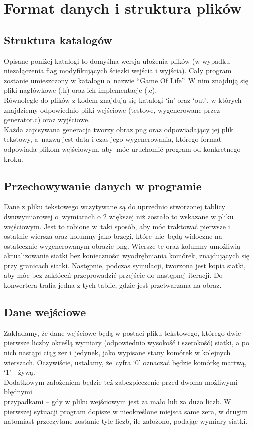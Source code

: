\documentclass{article}
\begin{document}
\section{Format danych i struktura plików}
\subsection{Struktura katalogów}
Opisane poniżej katalogi to domyślna wersja ułożenia plików (w
wypadku niezałączenia flag modyfikujących ścieżki wejścia i wyjścia).
Cały program zostanie umieszczony w katalogu o~nazwie “Game Of
Life”. W nim znajdują się pliki nagłówkowe (.h) oraz ich
implementacje (.c).\\ Równolegle do plików z kodem znajdują się katalogi ‘in’ oraz ‘out’,
 w których znajdziemy odpowiednio pliki wejściowe (testowe,
 wygenerowane przez generator.c) oraz wyjściowe.\\
 Każda zapisywana generacja tworzy obraz png oraz odpowiadający
 jej plik tekstowy, a~nazwą jest data i czas jego wygenerowania, którego
 format odpowiada plikom wejściowym, aby~móc uruchomić program od konkretnego kroku.

\subsection{Przechowywanie danych w programie}
Dane z pliku tekstowego wczytywane są do uprzednio stworzonej tablicy
dwuwymiarowej o~wymiarach o 2 większej niż zostało to wskazane w pliku
wejściowym. Jest to robione w~taki sposób, aby móc traktować pierwsze i
ostatnie wiersza oraz kolumny jako brzegi, które~nie~będą widoczne na
ostatecznie wygenerowanym obrazie png. Wiersze te oraz kolumny umożliwią
aktualizowanie siatki bez konieczności wyodrębniania komórek,
znajdujących się przy granicach siatki. Następnie, podczas symulacji, tworzona
jest kopia siatki, aby móc bez zakłóceń przeprowadzić przejście do następnej iteracji.
Do konwertera trafia jedna z tych tablic, gdzie jest przetwarzana na obraz.

\subsection{Dane wejściowe}
Zakładamy, że dane wejściowe będą w postaci pliku tekstowego, którego
dwie pierwsze liczby określą wymiary (odpowiednio wysokość i szerokość)
siatki, a po nich nastąpi ciąg zer i~jedynek, jako wypisane stany
komórek w kolejnych wierszach. Oczywiście, ustalamy, że~cyfra ‘0’
oznaczać będzie komórkę martwą, ‘1’ - żywą.\\
Dodatkowym założeniem będzie też zabezpieczenie przed dwoma możliwymi
błędnymi \\przypadkami -- gdy w pliku wejściowym jest za mało lub za dużo
liczb. W pierwszej sytuacji program dopisze w nieokreślone miejsca same
zera, w drugim natomiast przeczytane zostanie tyle liczb, ile założono,
podając wymiary siatki.
\end{document}
